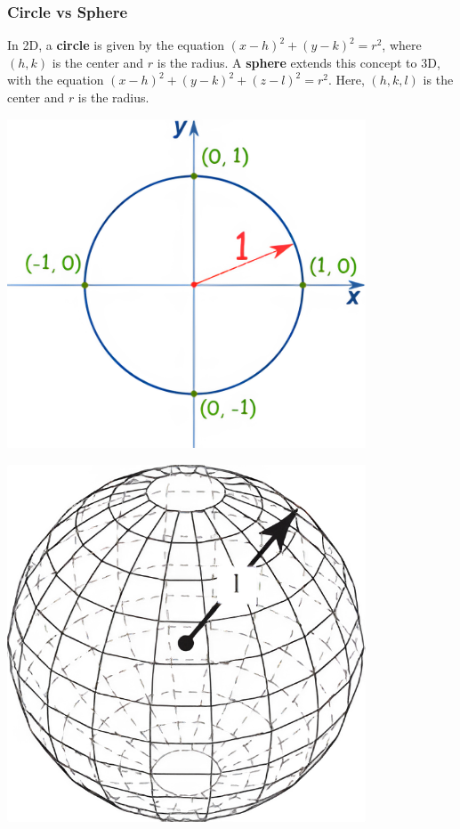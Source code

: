 \documentclass{article}
\begin{document}
\newpage

\subsubsection*{Circle vs Sphere}

In 2D, a \textbf{circle} is given by the equation \( (x - h)^2 + (y - k)^2 = r^2 \), where \( (h, k) \) is the center and \( r \) is the radius. A \textbf{sphere} extends this concept to 3D, with the equation \( (x - h)^2 + (y - k)^2 + (z - l)^2 = r^2 \). Here, \( (h, k, l) \) is the center and \( r \) is the radius.

\begin{illustrationbox}
    \begin{minipage}{0.5\textwidth}
        \centering
        \includegraphics[width=0.8\textwidth]{unit-circle.png}
    \end{minipage}
    \begin{minipage}{0.5\textwidth}
        \centering
        \includegraphics[width=0.8\textwidth]{unit-sphere.png}
    \end{minipage}
\end{illustrationbox}
\end{document}
